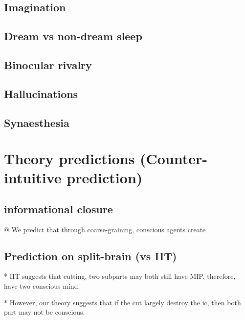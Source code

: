 \documentclass[utf8]{article}
\begin{document}
\begin{backup}
\subsection{Imagination}
\subsection{Dream vs non-dream sleep}
\subsection{Binocular rivalry}
\subsection{Hallucinations}
\subsection{Synaesthesia}




	\section*{Theory predictions (Counter-intuitive prediction)}

\subsection{informational closure}
\begin{ants}
	@ We predict that through coarse-graining, conscious agents create
\end{ants}



\subsection{Prediction on split-brain (vs IIT)}
* IIT suggests that cutting, two subparts may both still have MIP, therefore, have two conscious mind.

* However, our theory suggests that if the cut largely destroy the \ac{ic}, then both part may not be conscious.

\end{backup}
\end{document}
